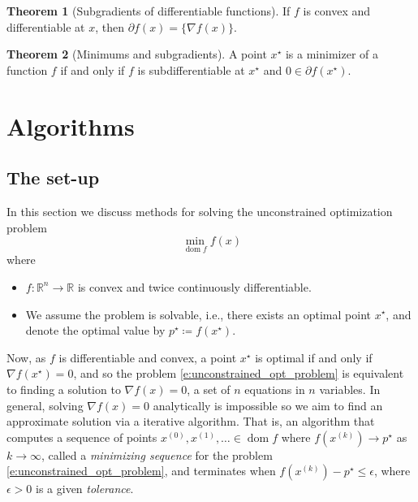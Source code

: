 \documentclass[11pt]{amsart}
\theoremstyle{definition}
\newtheorem{theorem}{Theorem}[section]
\theoremstyle{remark}
\DeclareMathOperator{\domain}{dom}
\begin{document}
        \begin{theorem}[Subgradients of differentiable functions]\label{t:subgrads_of_diff_functions}
            If $f$ is convex and differentiable at $x$, then $\partial f(x) = \{ \nabla f(x)\}$.
        \end{theorem}

        \begin{theorem}[Minimums and subgradients]\label{t:minimums_and_subgrads}
            A point $x^\star$ is a minimizer of a function $f$ if and only if $f$ is subdifferentiable at $x^\star$ and $0 \in \partial f(x^\star)$.
        \end{theorem}

\section{Algorithms}
    \subsection{The set-up}
        In this section we discuss methods for solving the unconstrained optimization problem 
        \begin{equation*}\label{e:unconstrained_opt_problem}
            \min_{\domain f} f(x)
        \end{equation*}
        where 
        \begin{itemize}
            \item $f: \mathbb{R}^n \to \mathbb{R}$ is convex and twice continuously differentiable.
            \item We assume the problem is solvable, i.e., there exists an optimal point $x^\star$, and denote the optimal value by $p^\star \coloneqq f(x^\star)$.
        \end{itemize} 
        Now, as $f$ is differentiable and convex, a point $x^\star$ is optimal if and only if $\nabla f(x^\star) = 0$, and so the problem \eqref{e:unconstrained_opt_problem} is equivalent to finding a solution to $\nabla f(x) = 0$, a set of $n$ equations in $n$ variables. In general, solving $\nabla f(x) = 0$ analytically is impossible so we aim to find an approximate solution via a iterative algorithm. That is, an algorithm that computes a sequence of points $x^{(0)}, x^{(1)}, \dots \in \domain f$ where $f(x^{(k)}) \to p^\star$ as $k \to \infty$, called  a \emph{minimizing sequence} for the problem \eqref{e:unconstrained_opt_problem}, and terminates when $f(x^{(k)}) - p^\star \leq \epsilon$, where $\epsilon > 0$ is a given \emph{tolerance}. 
\end{document}
